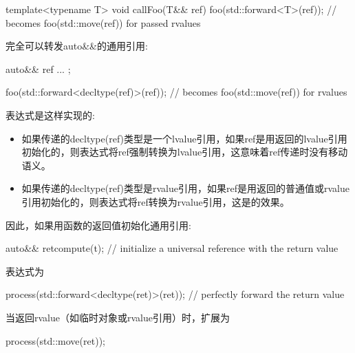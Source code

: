 \begin{cppcode}
template<typename T>
void callFoo(T&& ref) {
	foo(std::forward<T>(ref)); // becomes foo(std::move(ref)) for passed rvalues
}
\end{cppcode}

完全可以转发auto\&\&的通用引用:

\begin{cppcode}
auto&& ref{ ... };

foo(std::forward<decltype(ref)>(ref)); // becomes foo(std::move(ref)) for rvalues
\end{cppcode}

表达式是这样实现的:

\begin{itemize}
	\item 如果传递的decltype(ref)类型是一个lvalue引用，如果ref是用返回的lvalue引用初始化的，则表达式将ref强制转换为lvalue引用，这意味着ref传递时没有移动语义。
	\item 如果传递的decltype(ref)类型是rvalue引用，如果ref是用返回的普通值或rvalue引用初始化的，则表达式将ref转换为rvalue引用，这是的效果。
\end{itemize}

因此，如果用函数的返回值初始化通用引用:

\begin{cppcode}
auto&& ret{compute(t)}; // initialize a universal reference with the return value
\end{cppcode}

表达式为

\begin{cppcode}
process(std::forward<decltype(ret)>(ret)); // perfectly forward the return value
\end{cppcode}

当返回rvalue（如临时对象或rvalue引用）时，扩展为

\begin{cppcode}
process(std::move(ret));
\end{cppcode}
























